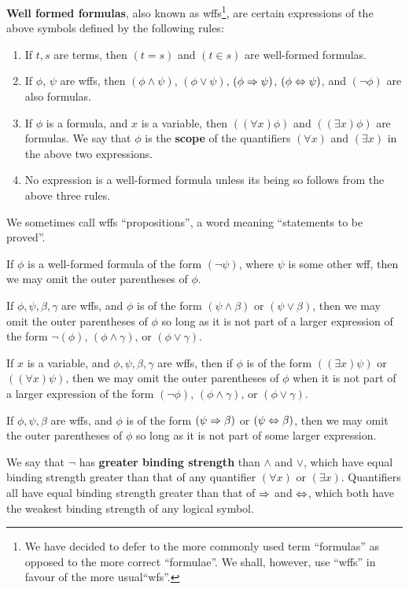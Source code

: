 \begin{defn}
\label{Defn: Wffs}
\textbf{Well formed formulas}, also known as wffs\footnote{We have decided to defer to the more commonly used term \enquote{formulas} as opposed to the more correct \enquote{formulae}. We shall, however, use \enquote{wffs} in favour of the more usual\enquote{wfs}.}, are certain expressions of the above symbols defined by the following rules:

\begin{enumerate}
\item If $t, s$ are terms, then $(t=s)$ and $(t\in s)$ are well-formed formulas. 

\item If $\phi$, $\psi$ are wffs, then $(\phi\land\psi)$, $(\phi\lor\psi)$, $(\phi\Rightarrow\psi)$, $(\phi\Leftrightarrow\psi)$, and $(\lnot\phi)$ are also formulas. 

\item If $\phi$ is a formula, and $x$ is a variable, then $((\forall x)\phi)$ and $((\exists x)\phi)$ are formulas. We say that $\phi$ is the \textbf{scope} of the quantifiers $(\forall x)$ and $(\exists x)$ in the above two expressions.

\item No expression is a well-formed formula unless its being so follows from the above three rules. 
\end{enumerate}

We sometimes call wffs \enquote{propositions}, a word meaning \enquote{statements to be proved}.
\end{defn}

\begin{convention}
\label{Conv: Logical Parentheses}
If $\phi$ is a well-formed formula of the form $(\lnot\psi)$, where $\psi$ is some other wff, then we may omit the outer parentheses of $\phi$. 

If $\phi, \psi, \beta, \gamma$ are wffs, and $\phi$ is of the form $(\psi\land\beta)$ or $(\psi\lor\beta)$,  then we may omit the outer parentheses of $\phi$ so long as it is not part of a larger expression of the form $\lnot(\phi)$, $(\phi\land\gamma)$, or $(\phi\lor\gamma)$. 

If $x$ is a variable, and $\phi, \psi, \beta, \gamma$ are wffs, then if $\phi$ is of the form $((\exists x)\psi)$ or $((\forall x)\psi)$, then we may omit the outer parentheses of  $\phi$ when it is not part of a larger expression of the form $(\lnot\phi)$, $(\phi\land\gamma)$, or $(\phi\lor\gamma)$. 

If $\phi, \psi, \beta$ are wffs, and $\phi$ is of the form $(\psi\Rightarrow\beta)$ or $(\psi\Leftrightarrow\beta)$, then we may omit the outer parentheses of $\phi$ so long as it is not part of some larger expression. 

We say that $\lnot$ has \textbf{greater binding strength} than $\land$ and $\lor$, which have equal binding strength greater than that of any quantifier $(\forall x)$ or $(\exists x)$. Quantifiers all have equal binding strength greater than that of $\Rightarrow$ and $\Leftrightarrow$, which both have the weakest binding strength of any logical symbol.
\end{convention}

